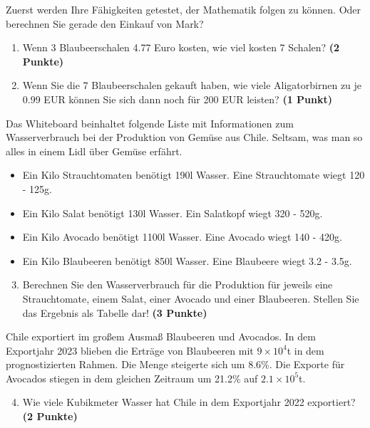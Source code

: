 \documentclass[a4paper, 9pt]{scrartcl}\usepackage[]{graphicx}\usepackage[]{xcolor}
\begin{document}
Zuerst werden Ihre Fähigkeiten getestet, der Mathematik folgen zu können. Oder berechnen Sie gerade den Einkauf von Mark?\\

\begin{enumerate}
\item Wenn 3 Blaubeerschalen 4.77 Euro kosten,  wie viel kosten 7 Schalen? \textbf{(2 Punkte)}
\item Wenn Sie die 7 Blaubeerschalen gekauft haben, wie viele Aligatorbirnen zu je 0.99 EUR können Sie sich dann noch für 200 EUR leisten? \textbf{(1 Punkt)}
\end{enumerate}

Das Whiteboard beinhaltet folgende Liste mit Informationen zum Wasserverbrauch bei der Produktion von Gemüse aus Chile. Seltsam, was man so alles in einem Lidl über Gemüse erfährt.
  
\begin{itemize}[noitemsep]
\item Ein Kilo Strauchtomaten benötigt 190l Wasser. Eine Strauchtomate wiegt 120 - 125g.
\item Ein Kilo Salat benötigt 130l Wasser. Ein Salatkopf wiegt 320 - 520g.
\item Ein Kilo Avocado benötigt 1100l Wasser. Eine Avocado wiegt 140 - 420g.
\item Ein Kilo Blaubeeren benötigt 850l Wasser. Eine Blaubeere wiegt 3.2 - 3.5g.
\end{itemize}

\begin{enumerate}
  \setcounter{enumi}{2}
\item Berechnen Sie den Wasserverbrauch für die Produktion für jeweils eine Strauchtomate, einem Salat, einer Avocado und einer Blaubeeren. Stellen Sie das Ergebnis als Tabelle dar! \textbf{(3 Punkte)}
\end{enumerate}

Chile exportiert im großem Ausmaß Blaubeeren und Avocados. In dem Exportjahr 2023 blieben die Erträge von Blaubeeren mit \ensuremath{9\times 10^{4}}t in dem prognostizierten Rahmen. Die Menge steigerte sich um 8.6\%. Die Exporte für Avocados stiegen in dem gleichen Zeitraum um 21.2\% auf \ensuremath{2.1\times 10^{5}}t.

\begin{enumerate}
  \setcounter{enumi}{3}
\item Wie viele Kubikmeter Wasser hat Chile in dem Exportjahr 2022 exportiert? \textbf{(2 Punkte)}
\end{enumerate}
\end{document}
